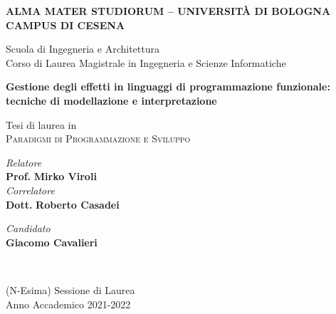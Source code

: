 \begin{titlepage}
	\begin{center}
		\large
		\textbf{ALMA MATER STUDIORUM -- UNIVERSITÀ DI BOLOGNA \\ CAMPUS DI CESENA}
		\\
		\noindent\hrulefill
		\vspace{0.4cm}

		\Large
		Scuola di Ingegneria e Architettura \\
		Corso di Laurea Magistrale in Ingegneria e Scienze Informatiche

		\Huge
		\vspace{4cm}
		\textbf{Gestione degli effetti in linguaggi di programmazione funzionale: tecniche di modellazione e interpretazione}

		\large
		\vspace{1cm}
		Tesi di laurea in
		\\
		\textsc{Paradigmi di Programmazione e Sviluppo}

		\vspace{5.5cm}
		\begin{minipage}[t]{0.64\textwidth}
			\begin{flushleft}
				\textit{Relatore}
				\\
				\textbf{Prof.} \textbf{Mirko Viroli}
				\\
				\vspace{0.4cm}
				\textit{Correlatore}
				\\
				\textbf{Dott.} \textbf{Roberto Casadei}
			\end{flushleft}
		\end{minipage}
		\begin{minipage}[t]{0.34\textwidth}
			\begin{flushright}
				\textit{Candidato}
				\\
				\textbf{Giacomo Cavalieri}
			\end{flushright}
		\end{minipage}\\

		\vfill
		\noindent\hrulefill
		\vspace{0.3cm}
		\Large

		(N-Esima) Sessione di Laurea
		\\
		Anno Accademico 2021-2022
	\end{center}
\end{titlepage}
\restoregeometry